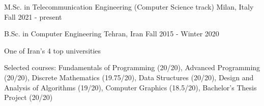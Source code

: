 

\begin{cventries}


  \cventry
    {M.Sc. in Telecommunication Engineering (Computer Science track)} %
    {} %
    {Milan, Italy} %
    {Fall 2021 - present} %
    {
    }

  \cventry
    {B.Sc. in Computer Engineering} %
    {} %
    {Tehran, Iran} %
    {Fall 2015 - Winter 2020} %
    {
      \begin{cvitems} %
      \item {
      	One of Iran's 4 top universities
      }
        \item {Selected courses: Fundamentals of Programming (20/20), Advanced Programming (20/20), Discrete Mathematics (19.75/20), \newline Data Structures (20/20), Design and Analysis of Algorithms (19/20), Computer Graphics (18.5/20), Bachelor's Thesis Project (20/20)}
      \end{cvitems}
    }


\end{cventries}
